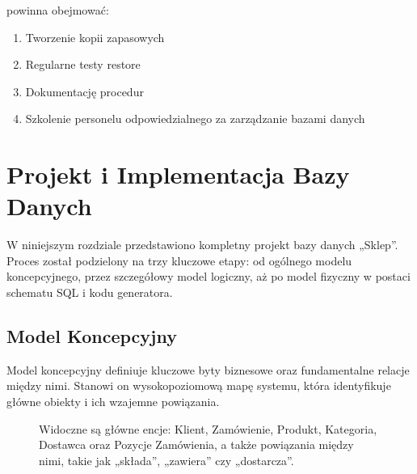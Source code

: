 \documentclass[a4paper,11pt,polish]{sphinxmanual}
\begin{document}
\sphinxAtStartPar
{} powinna obejmować:
\begin{enumerate}
%
\item {} 
\sphinxAtStartPar
Tworzenie kopii zapasowych

\item {} 
\sphinxAtStartPar
Regularne testy restore

\item {} 
\sphinxAtStartPar
Dokumentację procedur

\item {} 
\sphinxAtStartPar
Szkolenie personelu odpowiedzialnego za zarządzanie bazami danych

\end{enumerate}

\sphinxstepscope


\chapter{Projekt i Implementacja Bazy Danych}
\label{\detokenize{rozdzial_3:projekt-i-implementacja-bazy-danych}}\label{\detokenize{rozdzial_3:rozdzial-3}}\label{\detokenize{rozdzial_3::doc}}
\sphinxAtStartPar
W niniejszym rozdziale przedstawiono kompletny projekt bazy danych „Sklep”. Proces został podzielony na trzy kluczowe etapy: od ogólnego modelu koncepcyjnego, przez szczegółowy model logiczny, aż po model fizyczny w postaci schematu SQL i kodu generatora.


\section{Model Koncepcyjny}
\label{\detokenize{rozdzial_3:model-koncepcyjny}}
\sphinxAtStartPar
Model koncepcyjny definiuje kluczowe byty biznesowe oraz fundamentalne relacje między nimi. Stanowi on wysokopoziomową mapę systemu, która identyfikuje główne obiekty i ich wzajemne powiązania.

\begin{figure}[htbp]
\centering
\capstart

\noindent{}
\caption{ Widoczne są główne encje: Klient, Zamówienie, Produkt, Kategoria, Dostawca oraz Pozycje Zamówienia, a także powiązania między nimi, takie jak „składa”, „zawiera” czy „dostarcza”.}\label{\detokenize{rozdzial_3:id1}}\end{figure}
\end{document}
